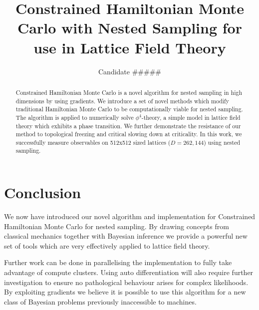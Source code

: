 \documentclass[aps,prd,reprint,preprintnumbers,showpacs,floatfix,nofootinbib,superscript address]{revtex4-2}
\begin{document}
\title{Constrained Hamiltonian Monte Carlo with Nested Sampling for use in Lattice Field Theory}

\author{Candidate \#\#\#\#\#}

\begin{abstract}
     Constrained Hamiltonian Monte Carlo is a novel algorithm for nested sampling in high dimensions by using gradients.
     We introduce a set of novel methods which modify traditional Hamiltonian Monte Carlo to be computationally viable for
     nested sampling.
     The algorithm is applied to numerically solve $\phi^4$-theory, a simple model in lattice field theory which
     exhibits a phase transition.
     We further demonstrate the resistance of our method to topological freezing and critical slowing down at criticality.
     In this work, we successfully measure observables on 512x512 sized lattices ($D=262,144$) using nested sampling.
\end{abstract}


\maketitle

















\section{Conclusion}\label{sec:conclusion}
     We now have introduced our novel algorithm and implementation for Constrained Hamiltonian Monte Carlo for nested sampling.
     By drawing concepts from classical mechanics together with Bayesian inference we provide a powerful
     new set of tools which are very effectively applied to lattice field theory.

     Further work can be done in parallelising the implementation to fully take advantage of compute clusters.
     Using auto differentiation will also require further investigation to ensure no pathological behaviour arises for
     complex likelihoods.
     By exploiting gradients we believe it is possible to use this algorithm for a new class of
     Bayesian problems previously inaccessible to machines.






\end{document}
